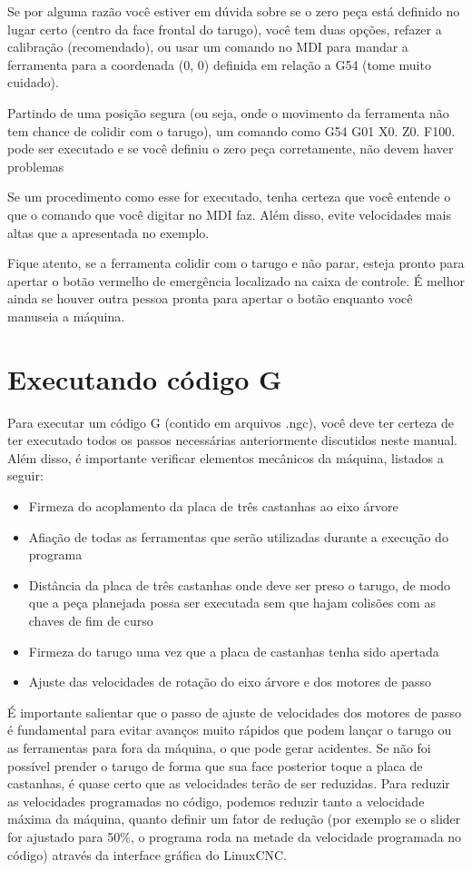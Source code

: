 \documentclass[twoside,a4paper]{refart}
\begin{document}
Se por alguma razão você estiver em dúvida sobre se o zero peça está definido no lugar certo (centro da face frontal do tarugo), você tem duas opções, refazer a calibração (recomendado), ou usar um comando no MDI para mandar a ferramenta para a coordenada (0, 0) definida em relação a G54 (tome muito cuidado).

Partindo de uma posição segura (ou seja, onde o movimento da ferramenta não tem chance de colidir com o tarugo), um comando como G54 G01 X0. Z0. F100. pode ser executado e se você definiu o zero peça corretamente, não devem haver problemas

\attention Se um procedimento como esse for executado, tenha certeza que você entende o que o comando que você digitar no MDI faz. Além disso, evite velocidades mais altas que a apresentada no exemplo.

\attention Fique atento, se a ferramenta colidir com o tarugo e não parar, esteja pronto para apertar o botão vermelho de emergência localizado na caixa de controle. É melhor ainda se houver outra pessoa pronta para apertar o botão enquanto você manuseia a máquina. 

\section{Executando código G}

Para executar um código G (contido em arquivos .ngc), você deve ter certeza de ter executado todos os passos necessárias anteriormente discutidos neste manual. Além disso, é importante verificar elementos mecânicos da máquina, listados a seguir:

\begin{itemize}
    \item Firmeza do acoplamento da placa de três castanhas ao eixo árvore 
    \item Afiação de todas as ferramentas que serão utilizadas durante a execução do programa 
    \item Distância da placa de três castanhas onde deve ser preso o tarugo, de modo que a peça planejada possa ser executada sem que hajam colisões com as chaves de fim de curso
    \item Firmeza do tarugo uma vez que a placa de castanhas tenha sido apertada
    \item Ajuste das velocidades de rotação do eixo árvore e dos motores de passo
\end{itemize}

É importante salientar que o passo de ajuste de velocidades dos motores de passo é fundamental para evitar avanços muito rápidos que podem lançar o tarugo ou as ferramentas para fora da máquina, o que pode gerar acidentes. Se não foi possível prender o tarugo de forma que sua face posterior toque a placa de castanhas, é quase certo que as velocidades terão de ser reduzidas. Para reduzir as velocidades programadas no código, podemos reduzir tanto a velocidade máxima da máquina, quanto definir um fator de redução (por exemplo se o slider for ajustado para 50\%, o programa roda na metade da velocidade programada no código) através da interface gráfica do LinuxCNC.
\end{document}
